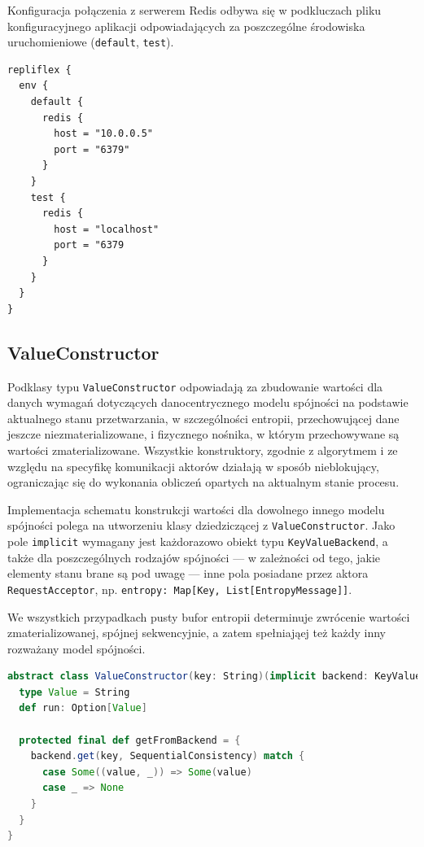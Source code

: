 Konfiguracja połączenia z serwerem Redis odbywa się w podkluczach pliku konfiguracyjnego aplikacji odpowiadających za poszczególne środowiska uruchomieniowe (\texttt{default}, \texttt{test}).

\begin{lstlisting}[caption=Konfiguracja dostępu do serwera bazy danych Redis]
repliflex {
  env {
    default {
      redis {
        host = "10.0.0.5"
        port = "6379"
      }
    }
    test {
      redis {
        host = "localhost"
        port = "6379
      }
    }
  }
}
\end{lstlisting}

\subsection{ValueConstructor} \label{subsection:valueconstructor}

Podklasy typu \texttt{ValueConstructor} odpowiadają za zbudowanie wartości dla danych wymagań dotyczących danocentrycznego modelu spójności na podstawie aktualnego stanu przetwarzania, w szczególności entropii, przechowującej dane jeszcze niezmaterializowane, i fizycznego nośnika, w którym przechowywane są wartości zmaterializowane. Wszystkie konstruktory, zgodnie z algorytmem i ze względu na specyfikę komunikacji aktorów działają w sposób nieblokujący, ograniczając się do wykonania obliczeń opartych na aktualnym stanie procesu.

Implementacja schematu konstrukcji wartości dla dowolnego innego modelu spójności polega na utworzeniu klasy dziedziczącej z \texttt{ValueConstructor}. Jako pole \texttt{implicit} wymagany jest każdorazowo obiekt typu \texttt{KeyValueBackend}, a także dla poszczególnych rodzajów spójności --- w zależności od tego, jakie elementy stanu brane są pod uwagę --- inne pola posiadane przez aktora \texttt{RequestAcceptor}, np. \texttt{entropy: Map[Key, List[EntropyMessage]]}.

We wszystkich przypadkach pusty bufor entropii determinuje zwrócenie wartości zmaterializowanej, spójnej sekwencyjnie, a zatem spełniająej też każdy inny rozważany model spójności.

\begin{lstlisting}[language=Scala, caption=Definicja klasy abstrakcyjnej ValueConstructor]
abstract class ValueConstructor(key: String)(implicit backend: KeyValueBackend) {
  type Value = String
  def run: Option[Value]

  protected final def getFromBackend = {
    backend.get(key, SequentialConsistency) match {
      case Some((value, _)) => Some(value)
      case _ => None
    }
  }
}
\end{lstlisting}

